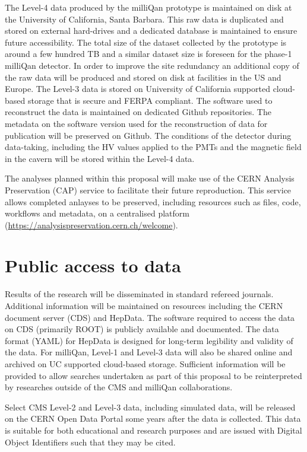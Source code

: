 \documentclass[11pt,a4paper]{article}
\theoremstyle{plain} \numberwithin{equation}{section}
\theoremstyle{definition}
\begin{document}
The Level-4 data produced by the milliQan prototype is maintained
on disk at the University of California, Santa Barbara. This raw data is duplicated and stored
on external hard-drives and a dedicated database is maintained to ensure future accessibility. 
The total size of the dataset collected by the prototype is around a few hundred TB and
a similar dataset size is foreseen for the phase-1 milliQan detector. In order to improve the 
site redundancy an additional copy of the raw data will be produced and stored on disk at 
facilities in the US and Europe. The Level-3 data is stored on University of California supported
cloud-based storage that is secure and FERPA compliant. The software used to reconstruct the 
data is maintained on dedicated Github repositories. The metadata on the software version used
for the reconstruction of data for publication will be preserved on Github. 
The conditions of the detector during data-taking,
including the HV values applied to the PMTs and the magnetic field in the cavern will be stored
within the Level-4 data.

The analyses planned within this proposal will make use of the CERN Analysis Preservation (CAP) service
to facilitate their future reproduction. This service 
allows completed anlayses to be preserved, including resources such as files, code, workflows 
and metadata, on a centralised platform (\href{https://analysispreservation.cern.ch/welcome}{https://analysispreservation.cern.ch/welcome}).

\section*{Public access to data}

Results of the research will be
disseminated in standard refereed journals. Additional information
will be maintained on resources including the 
CERN document server (CDS) and HepData. The software required to access the data
on CDS (primarily ROOT) is publicly available and documented. The data 
format (YAML) for HepData is designed for long-term legibility and validity
of the data. For milliQan, Level-1 and Level-3 data
will also be shared online and archived on UC supported cloud-based storage.
Sufficient information will be provided to allow searches undertaken as
part of this proposal to be reinterpreted by researches outside of
the CMS and milliQan collaborations.

Select CMS Level-2 and Level-3 data, including simulated data, will be released on the CERN Open Data Portal 
some years after the data is collected. This data is suitable for both educational and research purposes
and are issued with Digital Object Identifiers such that they may be cited.
\end{document}
